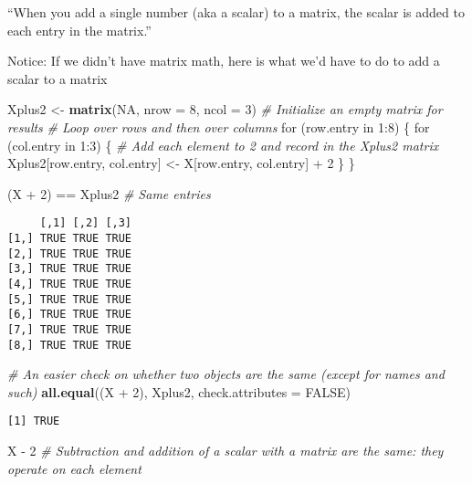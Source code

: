 \documentclass[10pt,]{article}
\newenvironment{Shaded}{\begin{snugshade}}{\end{snugshade}}
\newcommand{\KeywordTok}[1]{\textcolor[rgb]{0.13,0.29,0.53}{\textbf{{#1}}}}
\newcommand{\DataTypeTok}[1]{\textcolor[rgb]{0.13,0.29,0.53}{{#1}}}
\newcommand{\DecValTok}[1]{\textcolor[rgb]{0.00,0.00,0.81}{{#1}}}
\newcommand{\StringTok}[1]{\textcolor[rgb]{0.31,0.60,0.02}{{#1}}}
\newcommand{\CommentTok}[1]{\textcolor[rgb]{0.56,0.35,0.01}{\textit{{#1}}}}
\newcommand{\OtherTok}[1]{\textcolor[rgb]{0.56,0.35,0.01}{{#1}}}
\newcommand{\NormalTok}[1]{{#1}}
\begin{document}
``When you add a single number (aka a scalar) to a matrix, the scalar is
added to each entry in the matrix.''

Notice: If we didn't have matrix math, here is what we'd have to do to
add a scalar to a matrix

\begin{Shaded}
\begin{Highlighting}[]
\NormalTok{Xplus2 <-}\StringTok{ }\KeywordTok{matrix}\NormalTok{(}\OtherTok{NA}\NormalTok{, }\DataTypeTok{nrow =} \DecValTok{8}\NormalTok{, }\DataTypeTok{ncol =} \DecValTok{3}\NormalTok{)  }\CommentTok{# Initialize an empty matrix for results}
\CommentTok{# Loop over rows and then over columns}
\NormalTok{for (row.entry in }\DecValTok{1}\NormalTok{:}\DecValTok{8}\NormalTok{) \{}
    \NormalTok{for (col.entry in }\DecValTok{1}\NormalTok{:}\DecValTok{3}\NormalTok{) \{}
        \CommentTok{# Add each element to 2 and record in the Xplus2 matrix}
        \NormalTok{Xplus2[row.entry, col.entry] <-}\StringTok{ }\NormalTok{X[row.entry, col.entry] +}\StringTok{ }\DecValTok{2}
    \NormalTok{\}}
\NormalTok{\}}

\NormalTok{(X +}\StringTok{ }\DecValTok{2}\NormalTok{) ==}\StringTok{ }\NormalTok{Xplus2  }\CommentTok{# Same entries}
\end{Highlighting}
\end{Shaded}

\begin{verbatim}
     [,1] [,2] [,3]
[1,] TRUE TRUE TRUE
[2,] TRUE TRUE TRUE
[3,] TRUE TRUE TRUE
[4,] TRUE TRUE TRUE
[5,] TRUE TRUE TRUE
[6,] TRUE TRUE TRUE
[7,] TRUE TRUE TRUE
[8,] TRUE TRUE TRUE
\end{verbatim}

\begin{Shaded}
\begin{Highlighting}[]
\CommentTok{# An easier check on whether two objects are the same (except for names and such)}
\KeywordTok{all.equal}\NormalTok{((X +}\StringTok{ }\DecValTok{2}\NormalTok{), Xplus2, }\DataTypeTok{check.attributes =} \OtherTok{FALSE}\NormalTok{)}
\end{Highlighting}
\end{Shaded}

\begin{verbatim}
[1] TRUE
\end{verbatim}

\begin{Shaded}
\begin{Highlighting}[]
\NormalTok{X -}\StringTok{ }\DecValTok{2}  \CommentTok{# Subtraction and addition of a scalar with a matrix are the same: they operate on each element}
\end{Highlighting}
\end{Shaded}
\end{document}
